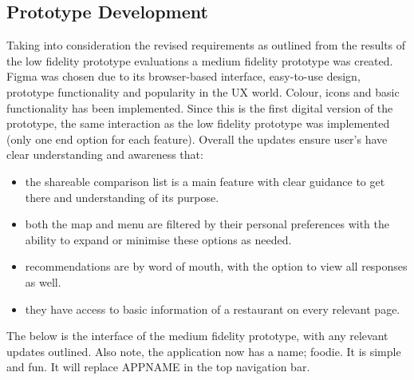 \documentclass[a4 paper, 12pt]{article}
\begin{document}
    \subsection{Prototype Development}
    Taking into consideration the revised requirements as outlined from the results of the low fidelity prototype evaluations a medium fidelity prototype was created. Figma was chosen due to its browser-based interface, easy-to-use design, prototype functionality and popularity in the UX world. Colour, icons and basic functionality has been implemented. Since this is the first digital version of the prototype, the same interaction as the low fidelity prototype was implemented (only one end option for each feature). Overall the updates ensure user's have clear understanding and awareness that:
        \begin{itemize}
            \item the shareable comparison list is a main feature with clear guidance to get there and understanding of its purpose.
            \item both the map and menu are filtered by their personal preferences with the ability to expand or minimise these options as needed.
            \item recommendations are by word of mouth, with the option to view all responses as well.
            \item they have access to basic information of a restaurant on every relevant page.
        \end{itemize}

        The below is the interface of the medium fidelity prototype, with any relevant updates outlined. Also note, the application now has a name; foodie. It is simple and fun. It will replace APPNAME in the top navigation bar. 
\end{document}
